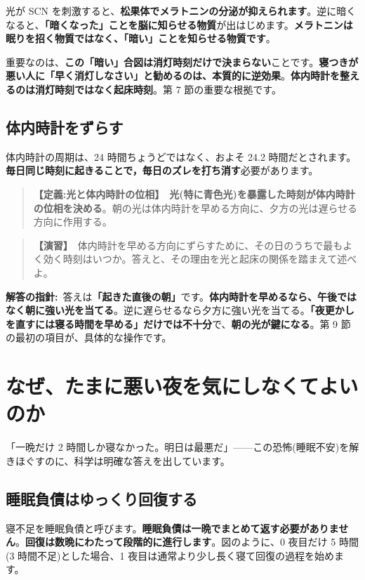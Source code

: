 \documentclass{article}
\begin{document}
光が SCN を刺激すると、\textbf{松果体でメラトニンの分泌が抑えられます}。逆に暗くなると、\textbf{「暗くなった」ことを脳に知らせる物質}が出はじめます。\textbf{メラトニンは眠りを招く物質ではなく、「暗い」ことを知らせる物質です}。

重要なのは、\textbf{この「暗い」合図は消灯時刻だけで決まらない}ことです。\textbf{寝つきが悪い人に「早く消灯しなさい」と勧めるのは、本質的に逆効果}。\textbf{体内時計を整えるのは消灯時刻ではなく起床時刻}。第 7 節の重要な根拠です。

\subsection{体内時計をずらす}

体内時計の周期は、24 時間ちょうどではなく、およそ 24.2 時間だとされます。\textbf{毎日同じ時刻に起きることで，毎日のズレを打ち消す}必要があります。

\begin{quote}
\textbf{【定義:光と体内時計の位相】}\ \textbf{光(特に青色光)を暴露した時刻が体内時計の位相を決める}。朝の光は体内時計を早める方向に、夕方の光は遅らせる方向に作用する。
\end{quote}

\begin{quote}
\textbf{【演習】}\ 体内時計を早める方向にずらすために、その日のうちで最もよく効く時刻はいつか。答えと、その理由を光と起床の関係を踏まえて述べよ。
\end{quote}

\textbf{解答の指針:}\ 答えは\textbf{「起きた直後の朝」}です。\textbf{体内時計を早めるなら、午後ではなく朝に強い光を当てる}。逆に遅らせるなら夕方に強い光を当てる。\textbf{「夜更かしを直すには寝る時間を早める」だけでは不十分}で、\textbf{朝の光が鍵になる}。第 9 節の最初の項目が、具体的な操作です。

\section{なぜ、たまに悪い夜を気にしなくてよいのか}

「一晩だけ 2 時間しか寝なかった。明日は最悪だ」——この恐怖(睡眠不安)を解きほぐすのに、科学は明確な答えを出しています。

\subsection{睡眠負債はゆっくり回復する}

寝不足を睡眠負債と呼びます。\textbf{睡眠負債は一晩でまとめて返す必要がありません}。\textbf{回復は数晩にわたって段階的に進行します}。図のように、0 夜目だけ 5 時間(3 時間不足)とした場合、1 夜目は通常より少し長く寝て回復の過程を始めます。
\end{document}
